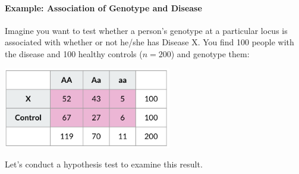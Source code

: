 \paragraph{Example: Association of Genotype and Disease} Imagine you want to test whether a person's genotype at a particular locus is associated with whether or not he/she has Disease X. You find 100 people with the disease and 100 healthy controls ($n=200$) and genotype them:

\begin{center}
\includegraphics[width=0.55\textwidth]{img/pearson-chisq-fig-1.png}
\end{center}

\noindent \noindent Let's conduct a hypothesis test to examine this result. 

\newcommand{\indep}{\perp \!\!\! \perp}
\newcommand{\independent}{\perp\mkern-9.5mu\perp}
\newcommand{\notindependent}{\centernot{\independent}}

